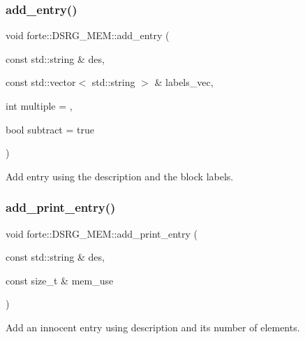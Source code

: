 \subsubsection{\texorpdfstring{add\+\_\+entry()}{add\_entry()}\hspace{0.1cm}{\footnotesize\ttfamily [2/2]}}
{\footnotesize\ttfamily void forte\+::\+D\+S\+R\+G\+\_\+\+M\+E\+M\+::add\+\_\+entry (\begin{DoxyParamCaption}\item[{const std\+::string \&}]{des,  }\item[{const std\+::vector$<$ std\+::string $>$ \&}]{labels\+\_\+vec,  }\item[{int}]{multiple = {},  }\item[{bool}]{subtract = {\ttfamily true} }\end{DoxyParamCaption})}



Add entry using the description and the block labels. 

\mbox{\label{classforte_1_1_d_s_r_g___m_e_m_a6b2ef9118482dc897088d28d29cffe2a}} 
\subsubsection{\texorpdfstring{add\+\_\+print\+\_\+entry()}{add\_print\_entry()}}
{\footnotesize\ttfamily void forte\+::\+D\+S\+R\+G\+\_\+\+M\+E\+M\+::add\+\_\+print\+\_\+entry (\begin{DoxyParamCaption}\item[{const std\+::string \&}]{des,  }\item[{const size\+\_\+t \&}]{mem\+\_\+use }\end{DoxyParamCaption})}



Add an innocent entry using description and its number of elements. 

\mbox{\label{classforte_1_1_d_s_r_g___m_e_m_a2339785c4d656ff51becb628c9c60926}} 
